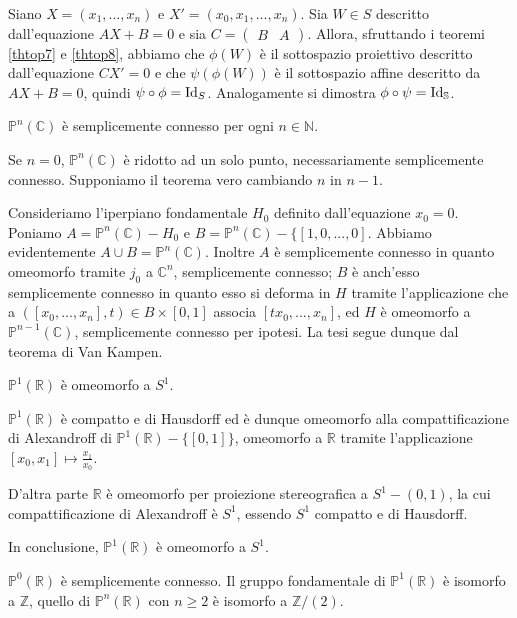 \Proof Siano $X = (x_1, ..., x_n)$ e $X' = (x_0, x_1, ..., x_n)$. Sia $W \in S$ descritto dall'equazione $AX + B = 0$ e sia $C = \left ( \begin{array}{c|c} B & A \end{array} \right )$. Allora, sfruttando i teoremi \ref{thtop7} e \ref{thtop8}, abbiamo che $\phi(W)$ \`e il sottospazio proiettivo descritto dall'equazione $CX' = 0$ e che $\psi(\phi(W))$ \`e il sottospazio affine descritto da $AX + B = 0$, quindi $\psi \circ \phi = \Identity_S$. Analogamente si dimostra $\phi \circ \psi = \Identity_{\mathbb{S}}$. \EndProof
\begin{Theorem}\label{thtop10}
	$\mathbb{P}^n(\mathbb{C})$ \`e semplicemente connesso per ogni $n \in \mathbb{N}$.
\end{Theorem}
\Proof Se $n = 0$, $\mathbb{P}^n(\mathbb{C})$ \`e ridotto ad un solo punto, necessariamente semplicemente connesso. Supponiamo il teorema vero cambiando $n$ in $n - 1$.
\par Consideriamo l'iperpiano fondamentale $H_0$ definito dall'equazione $x_0 = 0$. Poniamo $A = \mathbb{P}^n(\mathbb{C}) - H_0$ e $B = \mathbb{P}^n(\mathbb{C}) - \lbrace [1, 0, ..., 0]$. Abbiamo evidentemente $A \cup B = \mathbb{P}^n(\mathbb{C})$. Inoltre $A$ \`e semplicemente connesso in quanto omeomorfo tramite $j_0$ a $\mathbb{C}^n$, semplicemente connesso; $B$ \`e anch'esso semplicemente connesso in quanto esso si deforma in $H$ tramite l'applicazione che a $([x_0, ..., x_n], t) \in B \times [0,1]$ associa $[tx_0, ..., x_n]$, ed $H$ \`e omeomorfo a $\mathbb{P}^{n - 1}(\mathbb{C})$, semplicemente connesso per ipotesi. La tesi segue dunque dal teorema di Van Kampen. \EndProof
\begin{Theorem}\label{thtop11}
	$\mathbb{P}^1(\mathbb{R})$ \`e omeomorfo a $S^1$.
\end{Theorem}
\Proof $\mathbb{P}^1(\mathbb{R})$ \`e compatto e di Hausdorff ed \`e dunque omeomorfo alla compattificazione di Alexandroff di $\mathbb{P}^1(\mathbb{R}) - \lbrace [0, 1] \rbrace$, omeomorfo a $\mathbb{R}$ tramite l'applicazione $[x_0, x_1] \mapsto \frac{x_1}{x_0}$.
\par D'altra parte $\mathbb{R}$ \`e omeomorfo per proiezione stereografica a $S^1 - (0,1)$, la cui compattificazione di Alexandroff \`e $S^1$, essendo $S^1$ compatto e di Hausdorff.
\par In conclusione, $\mathbb{P}^1(\mathbb{R})$ \`e omeomorfo a $S^1$. \EndProof
\begin{Theorem}\label{thtop12}
	$\mathbb{P}^0(\mathbb{R})$ \`e semplicemente connesso. Il gruppo fondamentale di $\mathbb{P}^1(\mathbb{R})$ \`e isomorfo a $\mathbb{Z}$, quello di $\mathbb{P}^n(\mathbb{R})$ con $n \geq 2$ \`e isomorfo a $\mathbb{Z}/(2)$.
\end{Theorem}
